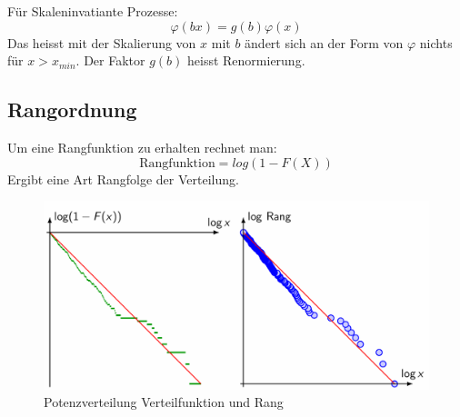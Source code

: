 \documentclass[../Main.tex]{subfiles}
\begin{document}
Für Skaleninvatiante Prozesse:
\begin{equation}
    \varphi(bx) = g(b)\varphi(x)
\end{equation}
Das heisst mit der Skalierung von \(x\) mit \(b\) ändert sich
an der Form von \(\varphi\) nichts für \(x > x_{min}\).
Der Faktor \(g(b)\) heisst Renormierung.



\subsection{Rangordnung}
Um eine Rangfunktion zu erhalten rechnet man:
\begin{equation}
    \text{Rangfunktion} = log(1-F(X))
\end{equation}
Ergibt eine Art Rangfolge der Verteilung.

\begin{figure}[H]
    \centering
    \includegraphics[width=0.75\linewidth]{Images/potenz-verteilfunktion-rang.png}
    \caption{Potenzverteilung Verteilfunktion und Rang}
\end{figure}
\end{document}
